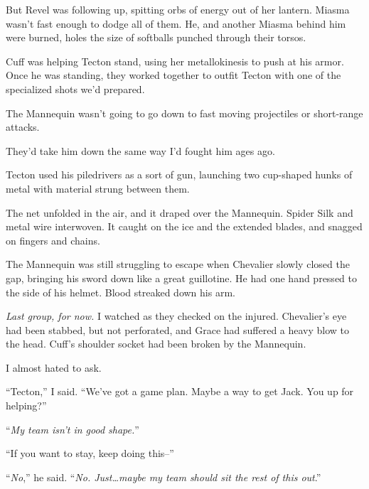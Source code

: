 But Revel was following up, spitting orbs of energy out of her lantern.  Miasma wasn't fast enough to dodge all of them.  He, and another Miasma behind him were burned, holes the size of softballs punched through their torsos.



Cuff was helping Tecton stand, using her metallokinesis to push at his armor.  Once he was standing, they worked together to outfit Tecton with one of the specialized shots we'd prepared.



The Mannequin wasn't going to go down to fast moving projectiles or short-range attacks.



They'd take him down the same way I'd fought him ages ago.



Tecton used his piledrivers as a sort of gun, launching two cup-shaped hunks of metal with material strung between them.



The net unfolded in the air, and it draped over the Mannequin.  Spider Silk and metal wire interwoven.  It caught on the ice and the extended blades, and snagged on fingers and chains.



The Mannequin was still struggling to escape when Chevalier slowly closed the gap, bringing his sword down like a great guillotine.  He had one hand pressed to the side of his helmet.  Blood streaked down his arm.



\emph{Last group, for now.  }I watched as they checked on the injured.  Chevalier's eye had been stabbed, but not perforated, and Grace had suffered a heavy blow to the head.  Cuff's shoulder socket had been broken by the Mannequin.



I almost hated to ask.



``Tecton,'' I said.  ``We've got a game plan.  Maybe a way to get Jack.  You up for helping?''



``\emph{My team isn't in good shape.}''



``If you want to stay, keep doing this--''



``\emph{No},'' he said.  ``\emph{No.  Just\ldots maybe my team should sit the rest of this out}.''



